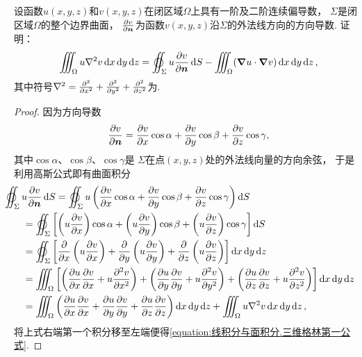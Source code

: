 \begin{example}[三维格林第一公式]
设函数\(u(x,y,z)\)和\(v(x,y,z)\)在闭区域\(\Omega\)上具有一阶及二阶连续偏导数，
\(\Sigma\)是闭区域\(\Omega\)的整个边界曲面，
\(\pdv{v}{\boldsymbol{n}}\)为函数\(v(x,y,z)\)沿\(\Sigma\)的外法线方向的方向导数.
证明：
\begin{equation}\label{equation:线积分与面积分.三维格林第一公式}
	\iiint_\Omega u \laplacian{v} \dd{x}\dd{y}\dd{z}
	= \varoiint_\Sigma u \pdv{v}{\vb{n}} \dd{S}
	- \iiint_\Omega (\grad u \cdot \grad v) \dd{x}\dd{y}\dd{z},
\end{equation}
其中符号\(\laplacian = \pdv[2]{x} + \pdv[2]{y} + \pdv[2]{z}\)为.
\begin{proof}
因为方向导数\[
	\pdv{v}{\boldsymbol{n}}
	= \pdv{v}{x} \cos\alpha
	+ \pdv{v}{y} \cos\beta
	+ \pdv{v}{z} \cos\gamma,
\]
其中\(\cos\alpha\)、\(\cos\beta\)、\(\cos\gamma\)是
\(\Sigma\)在点\((x,y,z)\)处的外法线向量的方向余弦，
于是利用高斯公式即有曲面积分\begin{align*}
	&\hspace{-20pt}\varoiint_\Sigma u \pdv{v}{\vb{n}} \dd{S}
	= \varoiint_\Sigma u \left(
			\pdv{v}{x} \cos\alpha
			+ \pdv{v}{y} \cos\beta
			+ \pdv{v}{z} \cos\gamma
		\right) \dd{S} \\
	&= \varoiint_\Sigma \left[
			\left( u \pdv{v}{x} \right) \cos\alpha
			+ \left( u \pdv{v}{y} \right) \cos\beta
			+ \left( u \pdv{v}{z} \right) \cos\gamma
		\right] \dd{S} \\
	&= \varoiint_\Sigma \left[
			\pdv{x} \left( u \pdv{v}{x} \right)
			+ \pdv{y} \left( u \pdv{v}{y} \right)
			+ \pdv{z} \left( u \pdv{v}{z} \right)
		\right] \dd{x}\dd{y}\dd{z} \\
	&= \iiint_\Omega \left[
			\left( \pdv{u}{x} \pdv{v}{x} + u \pdv[2]{v}{x} \right)
			+ \left( \pdv{u}{y} \pdv{v}{y} + u \pdv[2]{v}{y} \right)
			+ \left( \pdv{u}{z} \pdv{v}{z} + u \pdv[2]{v}{z} \right)
		\right] \dd{x}\dd{y}\dd{z} \\
	&= \iiint_\Omega \left(
			\pdv{u}{x} \pdv{v}{x}
			+ \pdv{u}{y} \pdv{v}{y}
			+ \pdv{u}{z} \pdv{v}{z}
		\right) \dd{x}\dd{y}\dd{z}
		+ \iiint_\Omega u \laplacian{v} \dd{x}\dd{y}\dd{z},
\end{align*}
将上式右端第一个积分移至左端便得\cref{equation:线积分与面积分.三维格林第一公式}.
\end{proof}
\end{example}

